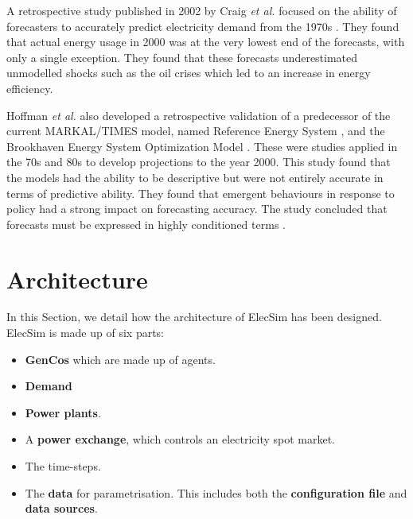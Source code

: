A retrospective study published in 2002 by Craig \textit{et al.} focused on the ability of forecasters to accurately predict electricity demand from the 1970s \cite{Craig2002}. They found that actual energy usage in 2000 was at the very lowest end of the forecasts, with only a single exception. They found that these forecasts underestimated unmodelled shocks such as the oil crises which led to an increase in energy efficiency.

Hoffman \textit{et al.} also developed a retrospective validation of a predecessor of the current MARKAL\slash TIMES model, named Reference Energy System \cite{Hoffman_1973}, and the Brookhaven Energy System Optimization Model \cite{ERDA_48}. These were studies applied in the 70s and 80s to develop projections to the year 2000. This study found that the models had the ability to be descriptive but were not entirely accurate in terms of predictive ability. They found that emergent behaviours in response to policy had a strong impact on forecasting accuracy. The study concluded that forecasts must be expressed in highly conditioned terms \cite{Hoffman2011}. 




















\clearpage
\section{Architecture}
\label{elecsim:sec:architecture}

In this Section, we detail how the architecture of ElecSim has been designed. ElecSim is made up of six parts: 
\begin{itemize}
	\item \textbf{GenCos} which are made up of agents.
	\item \textbf{Demand}
	\item \textbf{Power plants}.
	\item A \textbf{power exchange}, which controls an electricity spot market.
	\item The time-steps.
	\item The \textbf{data} for parametrisation. This includes both the \textbf{configuration file} and \textbf{data sources}.
\end{itemize}

